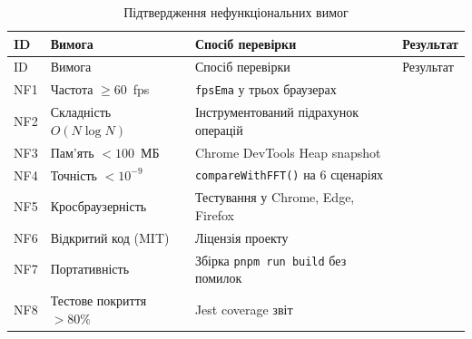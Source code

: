 \documentclass[
]{article}
\begin{document}
\begin{longtable}[]{@{}
  >{\raggedright\arraybackslash}p{}
  >{\raggedright\arraybackslash}p{}
  >{\raggedright\arraybackslash}p{}
  >{\raggedright\arraybackslash}p{}@{}}
\caption{\protect{}\label{tab:nf_verify}{}Підтвердження
нефункціональних вимог}\tabularnewline
\toprule\noalign{}
\begin{minipage}[b]{\linewidth}\raggedright
ID
\end{minipage} & \begin{minipage}[b]{\linewidth}\raggedright
Вимога
\end{minipage} & \begin{minipage}[b]{\linewidth}\raggedright
Спосіб перевірки
\end{minipage} & \begin{minipage}[b]{\linewidth}\raggedright
Результат
\end{minipage} \\
\midrule\noalign{}
\endfirsthead
\toprule\noalign{}
\begin{minipage}[b]{\linewidth}\raggedright
ID
\end{minipage} & \begin{minipage}[b]{\linewidth}\raggedright
Вимога
\end{minipage} & \begin{minipage}[b]{\linewidth}\raggedright
Спосіб перевірки
\end{minipage} & \begin{minipage}[b]{\linewidth}\raggedright
Результат
\end{minipage} \\
\midrule\noalign{}
\endhead
\bottomrule\noalign{}
\endlastfoot
NF1 & Частота \(\geq 60\)~fps & \texttt{fpsEma} у трьох браузерах & \\
NF2 & Складність \(O(N\log N)\) & Інструментований підрахунок операцій
& \\
NF3 & Пам'ять \(< 100\)~МБ & Chrome DevTools Heap snapshot & \\
NF4 & Точність \(< 10^{- 9}\) & \texttt{compareWithFFT}\texttt{()} на 6
сценаріях & \\
NF5 & Кросбраузерність & Тестування у Chrome, Edge, Firefox & \\
NF6 & Відкритий код (MIT) & Ліцензія проекту & \\
NF7 & Портативність & Збірка
\texttt{pnpm}\texttt{\ }\texttt{run}\texttt{\ }\texttt{build} без
помилок & \\
NF8 & Тестове покриття \(> 80\%\) & Jest coverage звіт & \\
\end{longtable}
\end{document}
